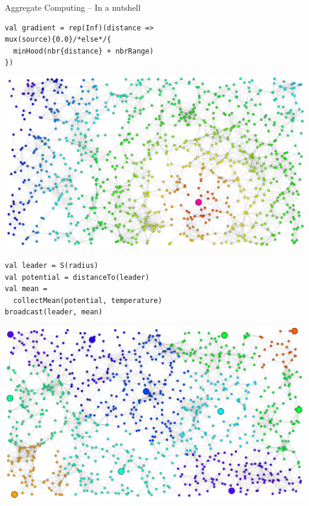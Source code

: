 \documentclass[8pt, aspectratio=169, handout]{beamer}
\begin{document}
\begin{frame}[fragile]{Aggregate Computing -- In a nutshell}
  \begin{multicols}{2}
    \begin{card}[Gradient]
    \begin{verbatim}
val gradient = rep(Inf)(distance =>
mux(source){0.0}/*else*/{
  minHood(nbr{distance} + nbrRange)
})
    \end{verbatim}
    \centering
    \includegraphics[width=0.7\linewidth]{img/result-gradient.png}
    \end{card}
    \begin{card}
    \begin{verbatim}
val leader = S(radius)
val potential = distanceTo(leader)
val mean =
  collectMean(potential, temperature)
broadcast(leader, mean)
  \end{verbatim}  
  \centering
  \includegraphics[width=0.68\linewidth]{img/distributed-sensing.png}   
  \end{card}
  \end{multicols}
\end{frame}
\end{document}
